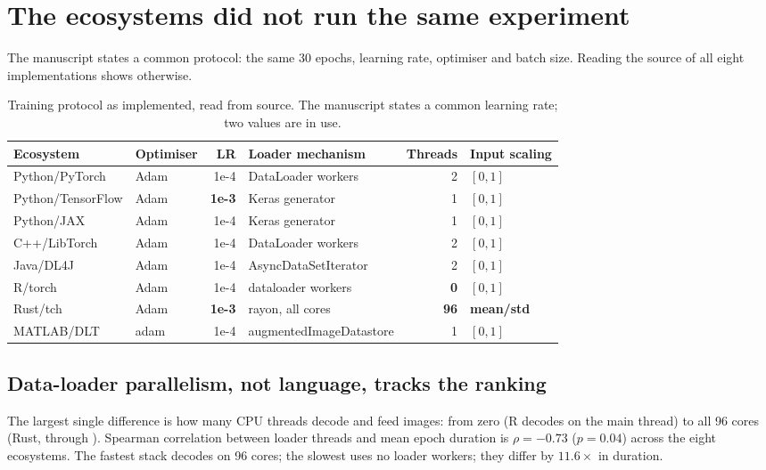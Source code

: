 \section{The ecosystems did not run the same experiment}
\label{sec:implementation}

The manuscript states a common protocol: the same 30 epochs, learning rate,
optimiser and batch size. Reading the source of all eight implementations shows
otherwise.

\begin{table}[t]
\centering
\caption{Training protocol as implemented, read from source. The manuscript
states a common learning rate; two values are in use.}
\label{tab:protocol}
\small
\begin{tabular}{llrlrl}
\toprule
Ecosystem & Optimiser & LR & Loader mechanism & Threads & Input scaling \\
\midrule
Python/PyTorch    & Adam & 1e-4 & DataLoader workers & 2 & $[0,1]$ \\
Python/TensorFlow & Adam & \textbf{1e-3} & Keras generator & 1 & $[0,1]$ \\
Python/JAX        & Adam & 1e-4 & Keras generator & 1 & $[0,1]$ \\
C++/LibTorch      & Adam & 1e-4 & DataLoader workers & 2 & $[0,1]$ \\
Java/DL4J         & Adam & 1e-4 & AsyncDataSetIterator & 2 & $[0,1]$ \\
R/torch           & Adam & 1e-4 & dataloader workers & \textbf{0} & $[0,1]$ \\
Rust/tch          & Adam & \textbf{1e-3} & rayon, all cores & \textbf{96} & \textbf{mean/std} \\
MATLAB/DLT        & adam & 1e-4 & augmentedImageDatastore & 1 & $[0,1]$ \\
\bottomrule
\end{tabular}
\end{table}

\subsection{Data-loader parallelism, not language, tracks the ranking}

The largest single difference is how many CPU threads decode and feed images: from
zero (R decodes on the main thread) to all 96 cores (Rust, through ).
Spearman correlation between loader threads and mean epoch duration is
\(\rho=-0.73\) (\(p=0.04\)) across the eight ecosystems. The fastest stack
decodes on 96 cores; the slowest uses no loader workers; they differ by
\(11.6\times\) in duration.

